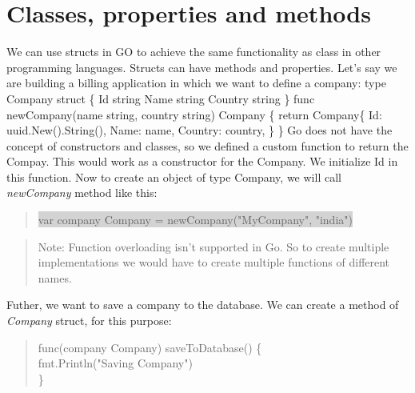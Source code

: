 \documentclass[12pt,a4paper]{report}
\begin{document}
\section*{Classes, properties and methods}
We can use structs in GO to achieve the same functionality as class in
other programming languages. Structs can have methods and properties.
Let's say we are building a billing application in which we want to define a company:
    type Company struct \{\newline
    \indent\indent Id      string\newline
    \indent\indent Name    string\newline
    \indent\indent Country string\newline
  \}\newline
  \newline
  func newCompany(name string, country string) Company \{
    \newline\indent return Company\{
      \newline\indent\indent Id:      uuid.New().String(),
      \newline\indent\indent Name:    name,
      \newline\indent\indent Country: country,
      \newline\indent\}
      \newline\}
  \newline\newline
Go does not have the concept of constructors and classes, so we defined a
custom function to return the Compay. This would work as a constructor
for the Company. We initialize Id in this function.
Now to create an object of type Company, we will call \textit{newCompany} method
like this:
\begin{quote}
  \colorbox{lightgray}{var company Company = newCompany("MyCompany", "india")}
\end{quote}
\begin{quote}
  Note: Function overloading isn't supported in Go. So to create multiple
  implementations we would have to create multiple functions of different names.
\end{quote}
Futher, we want to save a company to the database. We can create a method of \textit{Company} struct,
for this purpose:
\begin{quote}
  func(company Company) saveToDatabase() \{\\
  \textbf{\textrightarrow}fmt.Println("Saving Company")\\
  \}
\end{quote}
\end{document}
